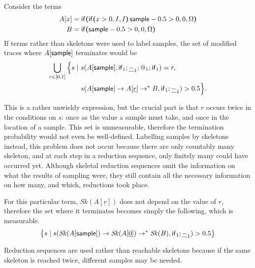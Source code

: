 \begin{example}
Consider the terms
\begin{align*}
A[x] &= \mathsf{if}\boldsymbol{(}\mathsf{if}\boldsymbol{(}x>0, I, I\boldsymbol{)} \, \mathsf{sample} - 0.5 > 0, 0, \Omega\boldsymbol{)}\\
B &= \mathsf{if}\boldsymbol{(}\mathsf{sample} - 0.5 > 0, 0, \Omega\boldsymbol{)}
\end{align*}
If terms rather than skeletons were used to label samples, the set of modified traces where $A[\mathsf{sample}]$ terminates would be
\begin{align*}
\bigcup_{r \in [0,1]} \Big\{s \mid\ & s(A[\mathsf{sample}], \mathsf{if}_1;\underline{-}_1;@_1;\mathsf{if}_1) = r, \\
& s(A[\mathsf{sample}] \to A[\underline r] \to^* B, \mathsf{if}_1 ; \underline{-}_1) > 0.5 \Big\}.
\end{align*}

\iffalse
\lo{The occurrence of $L_s(M)$ in the set comprehension below should be $L_0(M)$?}

\lo{I think we should write ``$[A[\tsample], A[\underline r], \ldots, B$'' in the line above as ``$A[\tsample] \to A[\underline r] \to^\ast B$''; similarly $\mathit{Sk}(A[\tsample]) \to \mathit{Sk}(A[\underline 0]) \to^\ast \mathit{Sk}(B)$ below.}
\fi
This is a rather unwieldy expression, but the crucial part is that $r$ occurs twice in the conditions on $s$: once as the value a sample must take, and once in the location of a sample. 
This set is unmeasurable, therefore the termination probability would not even be well-defined. 
Labelling samples by skeletons instead, this problem does not occur because there are only countably many skeleton, and at each step in a reduction sequence, only finitely many could have occurred yet. Although skeletal reduction sequences omit the information on what the results of sampling were, they still contain all the necessary information on how many, and which, reductions took place.

For this particular term, $\mathit{Sk}(A[\underline r])$ does not depend on the value of $r$, therefore the set where it terminates becomes simply the following, which is measurable.
\begin{align*}
\big\{s \mid s(\mathit{Sk}(A[\mathsf{sample}]) \to \mathit{Sk}(A[\underline 0]) \to^* \mathit{Sk}(B), \mathsf{if}_1 ; \underline{-}_1) > 0.5 \big\}
\end{align*}
\end{example}

Reduction sequences are used rather than reachable skeletons because if the same skeleton is reached twice, different samples may be needed. 

